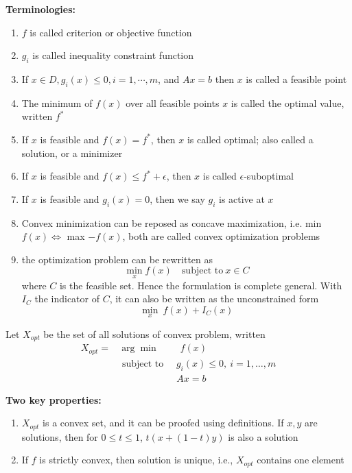 \documentclass[a4paper]{article}
\begin{document}
{\noindent \textbf{Terminologies:}
\begin{enumerate}
  \item $f$ is called criterion or objective function
  \item $g_i$ is called inequality constraint function
  \item If $x \in D, g_i(x) \leq 0, i= 1,\cdots, m$, and $Ax = b$ then $x$ is called a feasible point
  \item The minimum of $f(x)$ over all feasible points $x$ is called the optimal value, written $f^*$
  \item If $x$ is feasible and $f(x) = f^*$, then $x$ is called optimal; also called a solution, or a minimizer
  \item If $x$ is feasible and $f(x) \leq f^* + \epsilon$, then $x$ is called $\epsilon$-suboptimal
  \item If $x$ is feasible and $g_i(x) = 0$, then we say $g_i$ is active at $x$
  \item Convex minimization can be reposed as concave maximization, i.e.  min $f(x) \Leftrightarrow$ max $-f(x)$, both are called convex optimization problems
  \item the optimization problem can be rewritten as 
  \[
    \min_x f(x) \quad \text{subject to} \ x \in C
  \]
  where $C$ is the feasible set. Hence the formulation is complete general. With $I_C$ the indicator of $C$, it can also be written as the unconstrained form
  \[
    \min_x \ f(x) + I_C(x)
  \]
\end{enumerate}

\begin{defi} 
  Let $X_{opt}$ be the set of all solutions of convex problem, written 
  \begin{align*}
    X_{opt} = & \arg \min  \quad  \quad \ f(x) \\
      & \text { subject to }  \quad g_{i}(x) \leq 0, \ i=1, \ldots, m \\
      & \quad  \quad \quad \quad  \quad \quad Ax = b 
  \end{align*}
\end{defi}
\noindent \textbf{Two key properties:}
\begin{enumerate}
  \item $X_{opt}$ is a convex set, and it can be proofed using definitions. If $x, y$ are solutions, then for $0 \leq t \leq 1$, $t(x + (1-t)y)$ is also a solution
  \item If $f$ is strictly convex, then solution is unique, i.e., $X_{opt}$ contains one element 
\end{enumerate}

}
\end{document}
